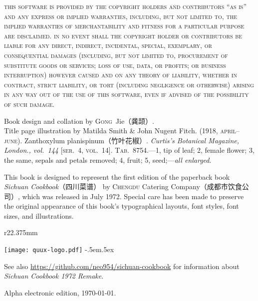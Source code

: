 \begingroup%
%
\textsc{this software is provided by the copyright holders and contributors
``as is'' and any express or implied warranties, including, but not limited to,
the implied warranties of merchantability and fitness for a particular purpose
are disclaimed. in no event shall the copyright holder or contributors be
liable for any direct, indirect, incidental, special, exemplary, or
consequential damages (including, but not limited to, procurement of
substitute goods or services; loss of use, data, or profits; or business
interruption) however caused and on any theory of liability, whether in
contract, strict liability, or tort (including negligence or otherwise)
arising in any way out of the use of this software, even if advised of the
possibility of such damage.}

\endgroup

\vfill

\setlength{\parskip}{.5\baselineskip}%

Book design and collation by \textsc{Gong}~Jie\!（龚颉）\!\!\!.\\
Title page illustration by Matilda Smith \& John Nugent Fitch. (1918,
\textsc{april--june}). Zanthoxylum planispinum\!（竹叶花椒）\!\!\!.
\textit{Curtis's Botanical Magazine, London., vol.~144} [\textsc{ser}.~4,
\textsc{vol}.~14]. \textsc{Tab}.~8754.---1, tip of leaf; 2, female flower;
3, the same, sepals and petals removed; 4, fruit; 5, seed;---\textit{all
enlarged}.

This book is designed to represent the first edition of the paperback book
\textit{Sichuan Cookbook}{\kafamily（四川菜谱）}\!\!\! by \textsc{Chengdu}
Catering Company\!（成都市饮食公司）\!\!\!, which was released in July 1972.
Special care has been made to preserve the original appearance of this book's
typographical layouts, font styles, font sizes, and illustrations.

\begin{wrapfigure}{r}{22.375mm}%
\vspace{-2.8125\baselineskip}%
\begin{flushright}%
\texttt{[image: quux-logo.pdf]}%
{\sffamily\tiny\kern-.5em\lower.5ex\hbox{\texttrademark}}%
\end{flushright}%
\vspace{-1.75\baselineskip}%
\end{wrapfigure}%

See also \url{https://github.com/neo954/sichuan-cookbook} for information
about \textit{Sichuan Cookbook 1972 Remake}.

Alpha electronic edition, \today.

\endgroup%

